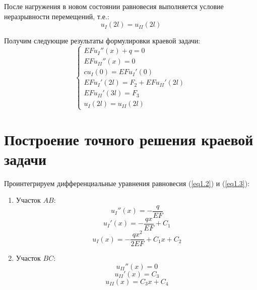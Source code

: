 После нагружения в новом состоянии равновесия выполняется условие неразрывности перемещений, т.е.:
\begin{equation}
    \label{eq1.13}
    u_{I} (2l) = u_{II} (2l)
\end{equation}

Получим следующие результаты формулировки краевой задачи:
\begin{equation}
    \label{eq1.14}
    \begin{cases}
        EFu_{I}'' (x) + q = 0
        \\
        EFu_{II}'' (x) = 0
        \\
        c u_{I} (0) = EFu_{I}' (0)
        \\
        EFu_{I}' (2l) = F_2 + EFu_{II}' (2l)
        \\
        EFu_{II}' (3l) = F_3
        \\
        u_{I} (2l) = u_{II} (2l)
    \end{cases}
\end{equation}

\section{Построение точного решения краевой задачи}

Проинтегрируем дифференциальные уравнения равновесия (\ref{eq1.2}) и (\ref{eq1.3}):
\begin{enumerate}
    \item Участок $AB$:
    \begin{equation}
        \label{2.1}
        u_{I}'' (x) = - \frac{q}{EF}
    \end{equation}
    \begin{equation}
        \label{eq2.2}
        u_{I}' (x) = - \frac{qx}{EF} + C_1
    \end{equation}
    \begin{equation}
        \label{eq2.3}
        u_{I} (x) = - \frac{qx^2}{2EF} + C_1 x + C_2
    \end{equation}
    \item Участок $BC$:
    \begin{equation}
        \label{eq2.4}
        u_{II}'' (x) = 0
    \end{equation}
    \begin{equation}
        \label{eq2.5}
        u_{II}' (x) = C_3
    \end{equation}
    \begin{equation}
        \label{eq2.6}
        u_{II} (x) = C_3 x + C_4
    \end{equation}
\end{enumerate}

